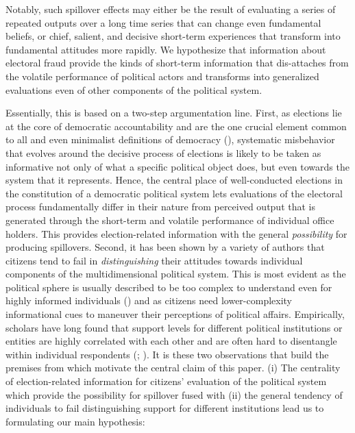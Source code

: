 \documentclass[11pt, ngerman,english,a4]{article}
\begin{document}
Notably, such spillover effects may either be the result of evaluating a series of repeated outputs over a long time series that can change even fundamental beliefs, or chief, salient, and decisive short-term experiences that transform into fundamental attitudes more rapidly. We hypothesize that information about electoral fraud provide the kinds of short-term information that dis-attaches from the volatile performance of political actors and transforms into generalized evaluations even of other components of the political system. 

Essentially, this is based on a two-step argumentation line. First, as elections lie at the core of democratic accountability and are the one crucial element common to all and even minimalist definitions of democracy (\citealt{przeworski_stokes_manin_1999}), systematic misbehavior that evolves around the decisive process of elections is likely to be taken as informative not only of what a specific political object does, but even towards the system that it represents. Hence, the central place of well-conducted elections in the constitution of a democratic political system lets evaluations of the electoral process fundamentally differ in their nature from perceived output that is generated through the short-term and volatile performance of individual office holders. This provides election-related information with the general \textit{possibility} for producing spillovers. Second, it has been shown by a variety of authors that citizens tend to fail in \textit{distinguishing} their attitudes towards individual components of the multidimensional political system. This is most evident as the political sphere is usually described to be too complex to understand even for highly informed individuals (\citealt{zaller_1992}) and as citizens need lower-complexity informational cues to maneuver their perceptions of political affairs. Empirically, scholars have long found that support levels for different political institutions or entities are highly correlated with each other and are often hard to disentangle within individual respondents (\citealt{Hooghe2012}; \citealt{Mishler2001}). It is these two observations that build the premises from which motivate the central claim of this paper. (i) The  centrality of election-related information for citizens’ evaluation of the political system which provide the possibility for spillover fused with (ii) the general tendency of individuals to fail distinguishing support for different institutions lead us to formulating our main hypothesis: \\
	
\end{document}

